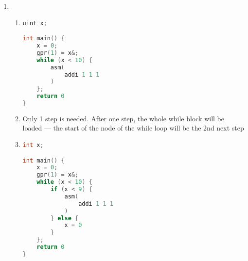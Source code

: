 \documentclass{article}
\begin{document}
\begin{enumerate}
{			\pagebreak
			
			Let's prove that $i \in J \rightarrow d.gpr(i) = d''.gpr(i)$. $d \rightarrow_{code(n,J)} d''$ where $code(n, J)$ is
			\begin{lstlisting}[numbers=none,language=]
code(n', J)
addi j j' 0
\end{lstlisting}
			It's obvious that $j \not\in J$ and given that $code(n', J)$ won't affect $J$ (from Lemma 94) and the last instruction of $code(n, J)$, \ \verb|addi j j' 0| \ won't change anything but the register $j$ so the set $J$ will remain unchanged.

			Lemma 127 suggests that the registers $i \in [28:31]$ always remain unchanged. However the syntax for C+A doesn't forbid us from accessing the those registers.
		}
        \item \begin{enumerate}
			\item {\hspace*{1em}
				\begin{minipage}[t]{0.5\linewidth}
					\begin{lstlisting}[language=c,tabsize=2]
uint x;

int main() {
	x = 0;
	gpr(1) = x&;
	while (x < 10) {
		asm(
			addi 1 1 1
		)
	};
	return 0
}
\end{lstlisting}
				\end{minipage}
			}
			\item {Only 1 step is needed. After one step, the whole while block will be loaded --- the start of the node of the while loop will be the 2nd next step}
			\item {\hspace*{1em}
				\begin{minipage}[t]{0.5\linewidth}
					\begin{lstlisting}[language=c,tabsize=2]
int x;

int main() {
	x = 0;
	gpr(1) = x&;
	while (x < 10) {
		if (x < 9) {
			asm(
				addi 1 1 1
			)
		} else {
			x = 0
		}
	};
	return 0
}
\end{lstlisting}
				\end{minipage}
			}
		\end{enumerate}
    \end{enumerate}
\end{document}
